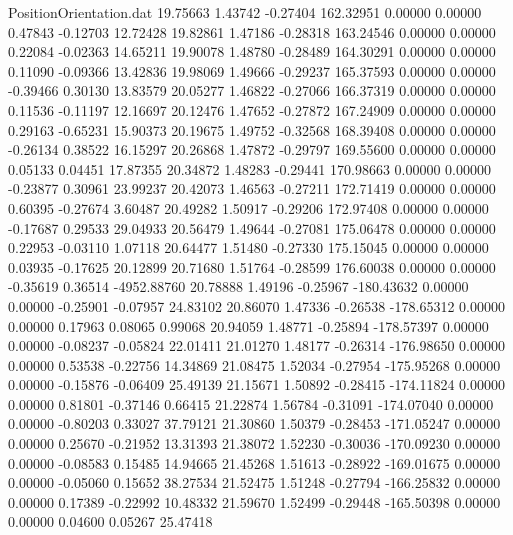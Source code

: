 \begin{filecontents}{PositionOrientation.dat}
  19.75663    1.43742   -0.27404   162.32951    0.00000    0.00000    0.47843   -0.12703   12.72428
  19.82861    1.47186   -0.28318   163.24546    0.00000    0.00000    0.22084   -0.02363   14.65211
  19.90078    1.48780   -0.28489   164.30291    0.00000    0.00000    0.11090   -0.09366   13.42836
  19.98069    1.49666   -0.29237   165.37593    0.00000    0.00000   -0.39466    0.30130   13.83579
  20.05277    1.46822   -0.27066   166.37319    0.00000    0.00000    0.11536   -0.11197   12.16697
  20.12476    1.47652   -0.27872   167.24909    0.00000    0.00000    0.29163   -0.65231   15.90373
  20.19675    1.49752   -0.32568   168.39408    0.00000    0.00000   -0.26134    0.38522   16.15297
  20.26868    1.47872   -0.29797   169.55600    0.00000    0.00000    0.05133    0.04451   17.87355
  20.34872    1.48283   -0.29441   170.98663    0.00000    0.00000   -0.23877    0.30961   23.99237
  20.42073    1.46563   -0.27211   172.71419    0.00000    0.00000    0.60395   -0.27674    3.60487
  20.49282    1.50917   -0.29206   172.97408    0.00000    0.00000   -0.17687    0.29533   29.04933
  20.56479    1.49644   -0.27081   175.06478    0.00000    0.00000    0.22953   -0.03110    1.07118
  20.64477    1.51480   -0.27330   175.15045    0.00000    0.00000    0.03935   -0.17625   20.12899
  20.71680    1.51764   -0.28599   176.60038    0.00000    0.00000   -0.35619    0.36514 -4952.88760
  20.78888    1.49196   -0.25967  -180.43632    0.00000    0.00000   -0.25901   -0.07957   24.83102
  20.86070    1.47336   -0.26538  -178.65312    0.00000    0.00000    0.17963    0.08065    0.99068
  20.94059    1.48771   -0.25894  -178.57397    0.00000    0.00000   -0.08237   -0.05824   22.01411
  21.01270    1.48177   -0.26314  -176.98650    0.00000    0.00000    0.53538   -0.22756   14.34869
  21.08475    1.52034   -0.27954  -175.95268    0.00000    0.00000   -0.15876   -0.06409   25.49139
  21.15671    1.50892   -0.28415  -174.11824    0.00000    0.00000    0.81801   -0.37146    0.66415
  21.22874    1.56784   -0.31091  -174.07040    0.00000    0.00000   -0.80203    0.33027   37.79121
  21.30860    1.50379   -0.28453  -171.05247    0.00000    0.00000    0.25670   -0.21952   13.31393
  21.38072    1.52230   -0.30036  -170.09230    0.00000    0.00000   -0.08583    0.15485   14.94665
  21.45268    1.51613   -0.28922  -169.01675    0.00000    0.00000   -0.05060    0.15652   38.27534
  21.52475    1.51248   -0.27794  -166.25832    0.00000    0.00000    0.17389   -0.22992   10.48332
  21.59670    1.52499   -0.29448  -165.50398    0.00000    0.00000    0.04600    0.05267   25.47418

\end{filecontents}
